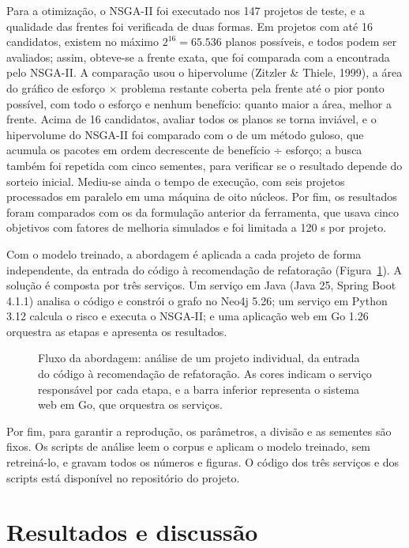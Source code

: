 \documentclass[
  a4paper,
]{article}
\begin{document}
Para a otimização, o NSGA-II foi executado nos 147 projetos de teste, e a qualidade das frentes foi verificada de duas formas. Em projetos com até 16 candidatos, existem no máximo $2^{16} = 65.536$ planos possíveis, e todos podem ser avaliados; assim, obteve-se a frente exata, que foi comparada com a encontrada pelo NSGA-II. A comparação usou o hipervolume (Zitzler \& Thiele, 1999), a área do gráfico de esforço $\times$ problema restante coberta pela frente até o pior ponto possível, com todo o esforço e nenhum benefício: quanto maior a área, melhor a frente. Acima de 16 candidatos, avaliar todos os planos se torna inviável, e o hipervolume do NSGA-II foi comparado com o de um método guloso, que acumula os pacotes em ordem decrescente de benefício ÷ esforço; a busca também foi repetida com cinco sementes, para verificar se o resultado depende do sorteio inicial. Mediu-se ainda o tempo de execução, com seis projetos processados em paralelo em uma máquina de oito núcleos. Por fim, os resultados foram comparados com os da formulação anterior da ferramenta, que usava cinco objetivos com fatores de melhoria simulados e foi limitada a 120 s por projeto.

Com o modelo treinado, a abordagem é aplicada a cada projeto de forma independente, da entrada do código à recomendação de refatoração (Figura~\ref{fig:fluxo-abordagem}). A solução é composta por três serviços. Um serviço em Java (Java 25, Spring Boot 4.1.1) analisa o código e constrói o grafo no Neo4j 5.26; um serviço em Python 3.12 calcula o risco e executa o NSGA-II; e uma aplicação web em Go 1.26 orquestra as etapas e apresenta os resultados.

\begin{figure}[htbp]
\centering

\caption{Fluxo da abordagem: análise de um projeto individual, da entrada do código à recomendação de refatoração. As cores indicam o serviço responsável por cada etapa, e a barra inferior representa o sistema web em Go, que orquestra os serviços.}
\label{fig:fluxo-abordagem}
\end{figure}

Por fim, para garantir a reprodução, os parâmetros, a divisão e as sementes são fixos. Os scripts de análise leem o corpus e aplicam o modelo treinado, sem retreiná-lo, e gravam todos os números e figuras. O código dos três serviços e dos scripts está disponível no repositório do projeto.

\hypertarget{resultados-e-discussuxe3o}{%
\section{Resultados e discussão}\label{resultados-e-discussuxe3o}}
\end{document}
